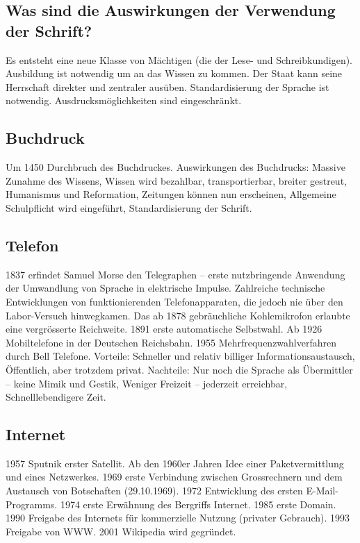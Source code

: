 \documentclass[10pt, openright=true]{scrartcl}
\begin{document}
\subsection{Was sind die Auswirkungen der Verwendung der Schrift?}
Es entsteht eine neue Klasse von Mächtigen (die der Lese- und Schreibkundigen). Ausbildung ist notwendig um an das Wissen zu kommen. Der Staat kann seine Herrschaft direkter und zentraler ausüben. Standardisierung der Sprache ist notwendig. Ausdrucksmöglichkeiten sind eingeschränkt.
\subsection{Buchdruck}
Um 1450 Durchbruch des Buchdruckes. Auswirkungen des Buchdrucks: Massive Zunahme des Wissens, Wissen wird bezahlbar, transportierbar, breiter gestreut, Humanismus und Reformation, Zeitungen können nun erscheinen, Allgemeine Schulpflicht wird eingeführt, Standardisierung der Schrift.
\subsection{Telefon}
1837 erfindet Samuel Morse den Telegraphen – erste nutzbringende Anwendung der Umwandlung von Sprache in elektrische Impulse. Zahlreiche technische Entwicklungen von funktionierenden Telefonapparaten, die jedoch nie über den Labor-Versuch hinwegkamen. Das ab 1878 gebräuchliche Kohlemikrofon erlaubte eine vergrösserte Reichweite. 1891 erste automatische Selbstwahl. Ab 1926 Mobiltelefone in der Deutschen Reichsbahn. 1955 Mehrfrequenzwahlverfahren durch Bell Telefone. Vorteile: Schneller und relativ billiger Informationsaustausch, Öffentlich, aber trotzdem privat. Nachteile: Nur noch die Sprache als Übermittler – keine Mimik und Gestik, Weniger Freizeit – jederzeit erreichbar, Schnelllebendigere Zeit.
\subsection{Internet}
1957 Sputnik erster Satellit. Ab den 1960er Jahren Idee einer Paketvermittlung und eines Netzwerkes. 1969 erste Verbindung zwischen Grossrechnern und dem Austausch von Botschaften (29.10.1969). 1972 Entwicklung des ersten E-Mail-Programms. 1974 erste Erwähnung des Bergriffs Internet. 1985 erste Domain. 1990 Freigabe des Internets für kommerzielle Nutzung (privater Gebrauch). 1993 Freigabe von WWW. 2001 Wikipedia wird gegründet. \vspace{-0.2cm}
\end{document}
